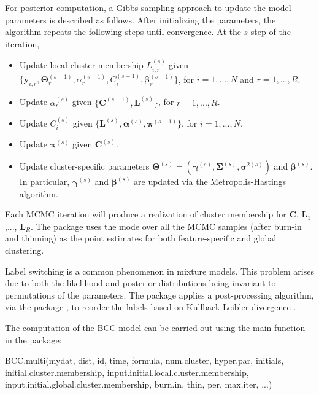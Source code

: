 For posterior computation, a Gibbs sampling approach to update the model parameters is described as follows. After initializing the parameters, the algorithm repeats the following steps until convergence. At the $s$ step of the iteration, 
 \begin{itemize}

	\item Update local cluster membership $ L_{i,r}^{(s)}$ given $\{\boldsymbol{y}_{i,r}, \boldsymbol{\Theta}_r^{(s-1)}, \alpha_r^{(s-1)}, C_i^{(s-1)}, \boldsymbol{\beta}_r^{(s-1)} \}$, for $i=1,...,N$ and  $r=1,...,R$.

	\item Update $\alpha_r^{(s)}$ given $\{ \boldsymbol{C}^{(s-1)}, \boldsymbol{L}^{(s)} \}$, for $r=1,...,R$.

	\item Update $ C_i^{(s)}$ given $\{ \boldsymbol{L}^{(s)},  \boldsymbol{\alpha}^{(s)}, \boldsymbol{\pi}^{(s-1)}\}$, for $i=1,...,N$.

	\item Update $\boldsymbol{\pi}^{(s)}$ given $ \boldsymbol{C}^{(s)}$.

	\item Update cluster-specific parameters $\boldsymbol{\Theta}^{(s)} = (\boldsymbol{\gamma}^{(s)},\boldsymbol{\Sigma}^{(s)}, \boldsymbol{\sigma}^{2(s)})$ and  $\boldsymbol{\beta}^{(s)}$. In particular, $\boldsymbol{\gamma}^{(s)}$ and $\boldsymbol{\beta}^{(s)}$ are updated via the Metropolis-Hastings algorithm.

\end{itemize}

Each MCMC iteration will produce a realization of cluster membership for $\boldsymbol{C}$, $\boldsymbol{L}_1$,..., $\boldsymbol{L}_R$. The package uses the mode over all the MCMC samples (after burn-in and thinning) as the point estimates for both feature-specific and global clustering. 

Label switching is a common phenomenon in mixture models. This problem arises due to both the likelihood and posterior distributions being invariant to permutations of the parameters. The  package applies a post-processing algorithm, via the  package \citep{Papastamoulis2016}, to reorder the labels based on Kullback-Leibler divergence \citep{Stephens2000}.

The computation of the BCC model can be carried out using the main function in the   package: 
\begin{example}
BCC.multi(mydat, dist, id, time, formula, num.cluster,  
		 hyper.par, initials, initial.cluster.membership, 
		 input.initial.local.cluster.membership, 
		 input.initial.global.cluster.membership,
		 burn.in, thin, per, max.iter, ...)
\end{example}

